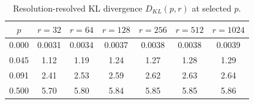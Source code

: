 \documentclass[12pt,a4paper,oneside]{book}
\theoremstyle{plain}
\theoremstyle{definition}
\theoremstyle{remark}
\begin{document}
\begin{table}[H]
\centering
\caption{Resolution-resolved KL divergence $D_{KL}(p,r)$ at selected $p$.}
\label{tab:raw_kl}
\begin{tabular}{c|cccccc}
\toprule
$p$ & $r=32$ & $r=64$ & $r=128$ & $r=256$ & $r=512$ & $r=1024$ \\
\midrule
0.000  & 0.0031 & 0.0034 & 0.0037 & 0.0038 & 0.0038 & 0.0039 \\
0.045  & 1.12   & 1.19   & 1.24   & 1.27   & 1.28   & 1.29 \\
0.091  & 2.41   & 2.53   & 2.59   & 2.62   & 2.63   & 2.64 \\
0.500  & 5.70   & 5.80   & 5.84   & 5.85   & 5.85   & 5.86 \\
\bottomrule
\end{tabular}
\end{table}
\end{document}
